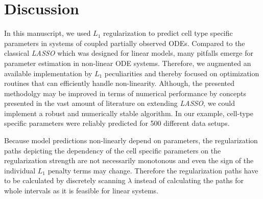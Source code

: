 \documentclass{bioinfo}
\begin{document}
%
%









%
%






\section{Discussion}
In this manuscript, we used $L_1$ regularization to predict cell type specific parameters in systems of coupled partially observed ODEs.
Compared to the classical \emph{LASSO} which was designed for linear models, many pitfalls emerge for parameter estimation in non-linear ODE systems.
Therefore, we augmented an available implementation by $L_1$ peculiarities
and thereby focused on optimization routines that can efficiently handle non-linearity.
Although, the presented methodolgy may be improved in terms of numerical performance by concepts presented in the vast amount of literature on extending \emph{LASSO}, 
we could implement a robust and numerically stable algorithm.
In our example, cell-type specific parameters were reliably predicted for 500 different data setups.

Because model predictions non-linearly depend on parameters, 
the regularization paths depicting the dependency of the cell specific parameters on the regularization strength 
are not necessarily monotonous and even the sign of the individual $L_1$ penalty terms may change.
Therefore the regularization paths have to be calculated by discretely scanning $\lambda$ 
instead of calculating the paths for whole intervals as it is feasible for linear systems.
\end{document}
